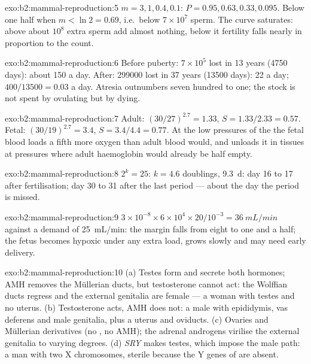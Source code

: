 \begin{solution}{exo:b2:mammal-reproduction:5}
$m = 3, 1, 0.4, 0.1$: $P = 0.95, 0.63, 0.33, 0.095$. Below one half
when $m < \ln 2 = 0.69$, i.e.\ below $7\times 10^{7}$ sperm. The
curve saturates: above about $10^{8}$ extra sperm add almost
nothing, below it fertility falls nearly in proportion to the count.
\end{solution}

\begin{solution}{exo:b2:mammal-reproduction:6}
Before puberty: $7\times 10^{5}$ lost in 13 years (\num{4750} days):
about 150 a day. After: \num{299000} lost in 37 years (\num{13500}
days): 22 a day;  $400/\num{13500} = 0.03$ a day. Atresia
outnumbers  seven hundred to one; the stock is not spent by
ovulating but by dying.
\end{solution}

\begin{solution}{exo:b2:mammal-reproduction:7}
Adult: $(30/27)^{2.7} = 1.33$, $S = 1.33/2.33 = 0.57$. Fetal:
$(30/19)^{2.7} = 3.4$, $S = 3.4/4.4 = 0.77$. At the low pressures of
the  the fetal blood loads a fifth more oxygen than adult
blood would, and unloads it in tissues at pressures where adult
haemoglobin would already be half empty.
\end{solution}

\begin{solution}{exo:b2:mammal-reproduction:8}
$2^{k} = 25$: $k = 4.6$ doublings, \qty{9.3}{d}: day 16 to 17 after
fertilisation; day 30 to 31 after the last period --- about the day
the period is missed.
\end{solution}

\begin{solution}{exo:b2:mammal-reproduction:9}
$3\times 10^{-8}\times 6\times 10^{4}\times 20/10^{-3} =
\qty{36}{mL/min}$ against a demand of \qty{25}{mL/min}: the margin
falls from eight to one and a half; the fetus becomes hypoxic under
any extra load, grows slowly and may need early delivery.
\end{solution}

\begin{solution}{exo:b2:mammal-reproduction:10}
(a) Testes form and secrete both hormones; AMH removes the Müllerian
ducts, but testosterone cannot act: the Wolffian ducts regress and
the external genitalia are female --- a woman with testes and no
uterus. (b) Testosterone acts, AMH does not: a male with epididymis,
vas deferens and male genitalia, plus a uterus and oviducts. (c)
Ovaries and Müllerian derivatives (no , no AMH); the adrenal
androgens virilise the external genitalia to varying degrees. (d)
\emph{SRY} makes testes, which impose the male path: a man with two
X chromosomes, sterile because the Y genes of  are
absent.
\end{solution}

